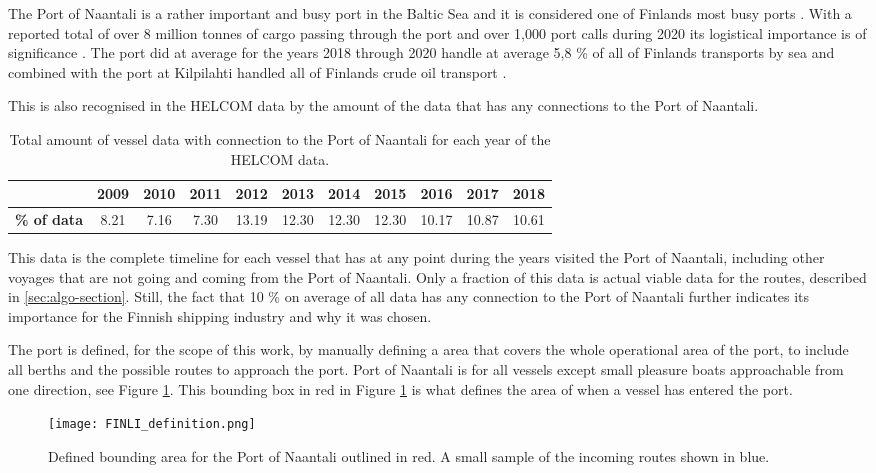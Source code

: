 \documentclass[../main.tex]{subfiles}
\begin{document}
The Port of Naantali is a rather important and busy port in the Baltic Sea and it is considered one of Finlands most busy ports \cite{SVRY_2022}. With a reported total of over 8 million tonnes of cargo passing through the port and over 1,000 port calls during 2020 its logistical importance is of significance \cite{PoN_2021}. The port did at average for the years 2018 through 2020 handle at average 5,8 \% of all of Finlands transports by sea and combined with the port at Kilpilahti handled all of Finlands crude oil transport \cite{TRAFICOM_2021}.

This is also recognised in the HELCOM data by the amount of the data that has any connections to the Port of Naantali.

\begin{table}[H]
\centering
\begin{tabular}{|l|c|c|c|c|c|c|c|c|c|c|}
\hline
\rowcolor[HTML]{C0C0C0} 
\multicolumn{1}{|r|}{\cellcolor[HTML]{C0C0C0}\textbf{Year}} & \textbf{2009} & \textbf{2010} & \textbf{2011} & \textbf{2012} & \textbf{2013} & \textbf{2014} & \textbf{2015} & \textbf{2016} & \textbf{2017} & \textbf{2018} \\ \hline
\textbf{\% of data}                           & 8.21          & 7.16          & 7.30          & 13.19         & 12.30         & 12.30         & 12.30         & 10.17         & 10.87         & 10.61         \\ \hline
\end{tabular}
\caption{Total amount of vessel data with connection to the Port of Naantali for each year of the HELCOM data.}
\label{tab:HELCOM-data-percent}
\end{table}

This data is the complete timeline for each vessel that has at any point during the years visited the Port of Naantali, including other voyages that are not going and coming from the Port of Naantali. Only a fraction of this data is actual viable data for the routes, described in \ref{sec:algo-section}. Still, the fact that 10 \% on average of all data has any connection to the Port of Naantali further indicates its importance for the Finnish shipping industry and why it was chosen.

The port is defined, for the scope of this work, by manually defining a area that covers the whole operational area of the port, to include all berths and the possible routes to approach the port. Port of Naantali is for all vessels except small pleasure boats approachable from one direction, see Figure \ref{fig:FINLI-box}. This bounding box in red in Figure \ref{fig:FINLI-box} is what defines the area of when a vessel has entered the port. 

\begin{figure}[H]
\centering
\texttt{[image: FINLI\_definition.png]}
\caption{Defined bounding area for the Port of Naantali outlined in red. A small sample of the incoming routes shown in blue.}
\label{fig:FINLI-box}
\end{figure}
\end{document}
